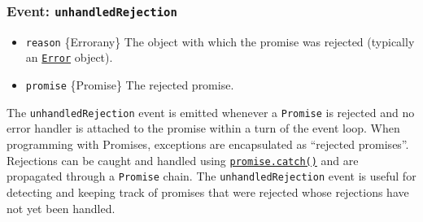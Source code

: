\subsubsection{\texorpdfstring{Event:
\texttt{\textquotesingle{}unhandledRejection\textquotesingle{}}}{Event: \textquotesingle unhandledRejection\textquotesingle{}}}\label{event-unhandledrejection}

\begin{itemize}
\tightlist
\item
  \texttt{reason} \{Error\textbar any\} The object with which the
  promise was rejected (typically an
  \href{errors.md\#class-error}{\texttt{Error}} object).
\item
  \texttt{promise} \{Promise\} The rejected promise.
\end{itemize}

The \texttt{\textquotesingle{}unhandledRejection\textquotesingle{}}
event is emitted whenever a \texttt{Promise} is rejected and no error
handler is attached to the promise within a turn of the event loop. When
programming with Promises, exceptions are encapsulated as ``rejected
promises''. Rejections can be caught and handled using
\href{https://developer.mozilla.org/en-US/docs/Web/JavaScript/Reference/Global_Objects/Promise/catch}{\texttt{promise.catch()}}
and are propagated through a \texttt{Promise} chain. The
\texttt{\textquotesingle{}unhandledRejection\textquotesingle{}} event is
useful for detecting and keeping track of promises that were rejected
whose rejections have not yet been handled.

\begin{Shaded}
\begin{Highlighting}[]
   \OperatorTok{;}

\NormalTok{(}\OperatorTok{,}\OperatorTok{,}\KeywordTok{=\textgreater{}}\NormalTok{ \{}
  \NormalTok{(}\OperatorTok{,}\OperatorTok{,} \OperatorTok{,}\OperatorTok{;}
\NormalTok{\})}\OperatorTok{;}

\KeywordTok{=\textgreater{}}\NormalTok{ \{}
   \NormalTok{(}\OperatorTok{;} 
\NormalTok{\})}\OperatorTok{;} 
\end{Highlighting}
\end{Shaded}

